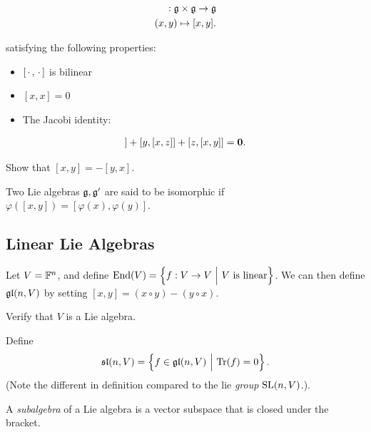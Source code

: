 \begin{align*}
[\wait, \wait]: \lieg \cross \lieg \to \lieg \\
(x,y) \mapsto [x, y]
.\end{align*}

satisfying the following properties:

\begin{itemize}
\tightlist
\item
  \([{\,\cdot\,}, {\,\cdot\,}]\) is bilinear
\item
  \([x, x] = 0\)
\item
  The Jacobi identity:
\end{itemize}

\begin{align*}
[x, [y, z]] + [y, [x,z]] + [z, [x, y]] = \vector 0
.\end{align*}



Show that \([x, y] = -[y,x]\). 


Two Lie algebras \({\mathfrak{g}}, {\mathfrak{g}}'\) are said to be isomorphic if
\(\varphi([x, y]) = [\varphi(x), \varphi(y)]\).

\hypertarget{linear-lie-algebras}{%
\subsection{Linear Lie Algebras}\label{linear-lie-algebras}}

Let \(V = {\mathbb{F}}^{n}\), and define
\(\mathrm{End}(V) = \left\{{f: V \to V {~\mathrel{\Big|}~} V \text{ is linear}}\right\}\).
We can then define \({\mathfrak{gl}}(n, V)\) by setting
\([x, y] = (x\circ y) - (y\circ x)\).


Verify that \(V\) is a Lie algebra. 


Define
\[{\mathfrak{sl}}(n, V) = \left\{{f \in {\mathfrak{gl}}(n, V) {~\mathrel{\Big|}~} \mathrm{Tr}(f) = 0}\right\}.\]
(Note the different in definition compared to the lie \emph{group}
\({\text{SL}}(n, V)\).). 


A \emph{subalgebra} of a Lie algebra is a vector subspace that is closed
under the bracket. 

